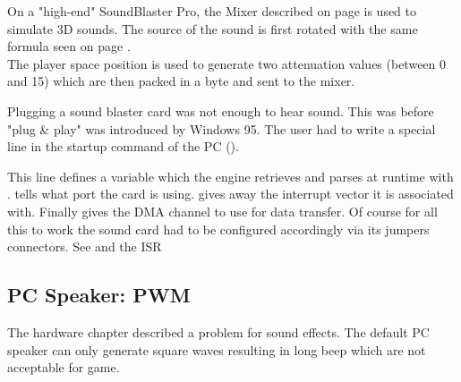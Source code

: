 On a "high-end" SoundBlaster Pro, the Mixer described on page \pageref{sbmixerpage} is used to simulate 3D sounds. The source of the sound is first rotated with the same formula seen on page \pageref{rotatematrix}.\\
The player space position is used to generate two attenuation values (between 0 and 15) which are then packed in a byte and sent to the mixer.\\
\par 
\begin{minipage}{\textwidth}

\end{minipage}
\par
{} Plugging a sound blaster card was not enough to hear sound. This was before "plug \& play" was introduced by Windows 95. The user had to write a special line in the startup command of the PC ().\\
\par 
\begin{minipage}{\textwidth}

\end{minipage}
\par
This line defines a variable  which the engine retrieves and parses at runtime with .  tells what port the card is using.  gives away the interrupt vector it is associated with. Finally  gives the DMA channel to use for data transfer. Of course for all this to work the sound card had to be configured accordingly via its jumpers connectors.
See  and the ISR  




 
\subsection{PC Speaker: PWM}
The hardware chapter described a problem for sound effects. The default PC speaker can only generate square waves resulting in long beep which are not acceptable for game.\\

